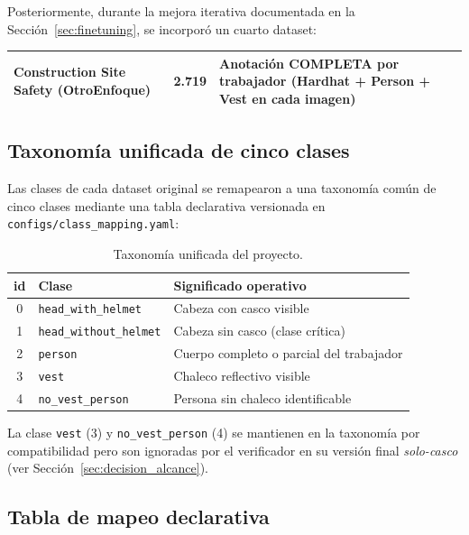 \documentclass[11pt,a4paper]{article}
\begin{document}
Posteriormente, durante la mejora iterativa documentada en la
Sección~\ref{sec:finetuning}, se incorporó un cuarto dataset:

\begin{table}[H]
\centering
\begin{tabular}{l r p{5.5cm}}
\toprule
Construction Site Safety (OtroEnfoque) & 2.719 & Anotación COMPLETA por
trabajador (Hardhat + Person + Vest en cada imagen) \\
\bottomrule
\end{tabular}
\end{table}

\subsection{Taxonomía unificada de cinco clases}

Las clases de cada dataset original se remapearon a una taxonomía común
de cinco clases mediante una tabla declarativa versionada en
\texttt{configs/class\_mapping.yaml}:

\begin{table}[H]
\centering
\caption{Taxonomía unificada del proyecto.}
\label{tab:taxonomia}
\begin{tabular}{c l p{8cm}}
\toprule
\textbf{id} & \textbf{Clase} & \textbf{Significado operativo} \\
\midrule
0 & \texttt{head\_with\_helmet} & Cabeza con casco visible \\
1 & \texttt{head\_without\_helmet} & Cabeza sin casco (clase crítica) \\
2 & \texttt{person} & Cuerpo completo o parcial del trabajador \\
3 & \texttt{vest} & Chaleco reflectivo visible \\
4 & \texttt{no\_vest\_person} & Persona sin chaleco identificable \\
\bottomrule
\end{tabular}
\end{table}

La clase \texttt{vest} (3) y \texttt{no\_vest\_person} (4) se mantienen
en la taxonomía por compatibilidad pero son ignoradas por el verificador
en su versión final \emph{solo-casco} (ver Sección~\ref{sec:decision_alcance}).

\subsection{Tabla de mapeo declarativa}
\end{document}
